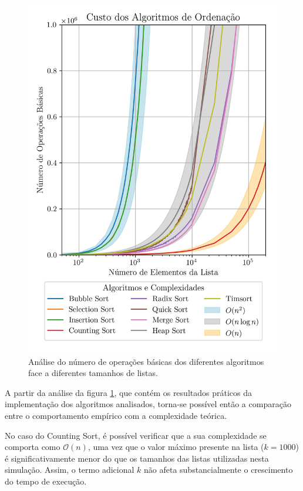 \documentclass[conference]{IEEEtran}
\begin{document}
\begin{figure}[H]
    \centering
    \includegraphics[width=1\linewidth]{sorting_complexities.png}
    \caption{Análise do número de operações básicas dos diferentes algoritmos face a diferentes tamanhos de listas.}
    \label{fig:sorting_complexities}
\end{figure}

A partir da análise da figura \ref{fig:sorting_complexities}, que contém os resultados práticos da implementação dos algoritmos analisados, torna-se possível então a comparação entre o comportamento empírico com a complexidade teórica.

No caso do Counting Sort, é possível verificar que a sua complexidade se comporta como \( \mathcal{O}(n) \), uma vez que o valor máximo presente na lista (\( k = 1000 \)) é significativamente menor do que os tamanhos das listas utilizadas nesta simulação. Assim, o termo adicional \( k \) não afeta substancialmente o crescimento do tempo de execução.
\end{document}
